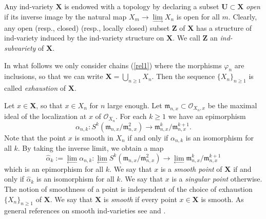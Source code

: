 \documentclass[12pt]{amsart}
\theoremstyle{definition}
\begin{document}
Any ind-variety $\mathbf{X}$ is endowed with a topology by declaring a subset $\mathbf{U}\subset\mathbf{X}$ {\em open} if its inverse image by the natural map $X_m\to\lim\limits_{\to}X_n$ is open for all $m$.
Clearly, any open (resp., closed) (resp., locally closed) subset $\mathbf{Z}$ of $\mathbf{X}$ has a structure of ind-variety induced by the ind-variety structure on $\mathbf{X}$.
We call $\mathbf{Z}$ an {\em ind-subvariety} of $\mathbf{X}$.

In what follows we only consider chains (\ref{rel1}) where the morphisms $\varphi_n$ are inclusions, so that we can write $\mathbf{X}=\bigcup_{n\geq 1} X_n$.
Then the sequence $\{X_n\}_{n\geq 1}$ is called {\em exhaustion} of $\mathbf{X}$.

Let $x\in \mathbf{X}$, so that $x\in X_n$ for $n$ large enough. Let
$\mathfrak{m}_{n,x}\subset \mathcal{O}_{X_n,x}$ be the maximal ideal of
the localization at $x$ of $\mathcal{O}_{X_n}$. For each $k\geq 1$ we have an
epimorphism
\begin{equation}
\label{**}
\alpha_{n,k}:S^k(\mathfrak{m}_{n,x}/\mathfrak{m}_{n,x}^2)\to \mathfrak{m}_{n,x}^k/\mathfrak{m}_{n,x}^{k+1}.
\end{equation}
Note that the point $x$ is smooth in $X_n$ if and only if
$\alpha_{n,k}$ is an isomorphism for all $k$. By taking the
inverse limit, we obtain a map
\[\hat\alpha_k:=\lim_{\leftarrow}\alpha_{n,k}:\lim_{\leftarrow}S^k(\mathfrak{m}_{n,x}/\mathfrak{m}_{n,x}^2)\to \lim_{\leftarrow}\mathfrak{m}_{n,x}^k/\mathfrak{m}_{n,x}^{k+1}\]
which is an epimorphism for all $k$. We say that $x$ is a {\em smooth
point} of $\mathbf{X}$ if and only if $\hat\alpha_k$ is an isomorphism for
all $k$. We say that $x$ is a {\em singular point} otherwise. The notion of smoothness of a point is independent of the choice of exhaustion $\{X_n\}_{n\geq 1}$ of $\mathbf{X}$. We say that $\mathbf{X}$ is {\em smooth} if every point $x\in\mathbf{X}$ is smooth.
As general references on smooth ind-varieties see \cite[Chapter 4]{K} and \cite{S}.
\end{document}

